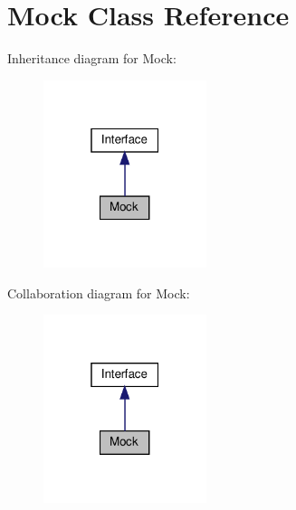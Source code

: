 \hypertarget{class_mock}{}\section{Mock Class Reference}
\label{class_mock}


Inheritance diagram for Mock\+:
\nopagebreak
\begin{figure}[H]
\begin{center}
\leavevmode
\includegraphics[width=135pt]{class_mock__inherit__graph}
\end{center}
\end{figure}


Collaboration diagram for Mock\+:
\nopagebreak
\begin{figure}[H]
\begin{center}
\leavevmode
\includegraphics[width=135pt]{class_mock__coll__graph}
\end{center}
\end{figure}
